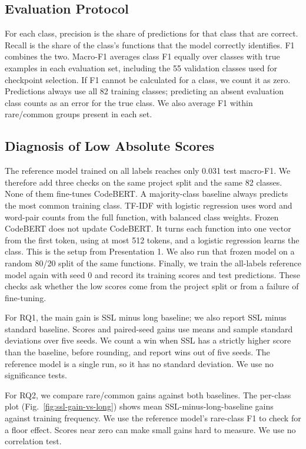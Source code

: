 \documentclass[conference]{IEEEtran}
\begin{document}
\subsection{Evaluation Protocol}\label{evaluation-protocol}

For each class, precision is the share of predictions for that class
that are correct. Recall is the share of the class's functions that the
model correctly identifies. F1 combines the two. Macro-F1 averages class
F1 equally over classes with true examples in each evaluation set,
including the 55 validation classes used for checkpoint selection. If F1
cannot be calculated for a class, we count it as zero. Predictions
always use all 82 training classes; predicting an absent evaluation
class counts as an error for the true class. We also average F1 within
rare/common groups present in each set.

\subsection{Diagnosis of Low Absolute
Scores}\label{diagnosis-of-low-absolute-scores}

The reference model trained on all labels reaches only 0.031 test macro-F1. We therefore add three checks on the same project split and the same 82 classes. None of them fine-tunes CodeBERT. A majority-class baseline always predicts the most common training class. TF-IDF with logistic regression uses word and word-pair counts from the full function, with balanced class weights. Frozen CodeBERT does not update CodeBERT. It turns each function into one vector from the first token, using at most 512 tokens, and a logistic regression learns the class. This is the setup from Presentation 1. We also run that frozen model on a random 80/20 split of the same functions. Finally, we train the all-labels reference model again with seed 0 and record its training scores and test predictions. These checks ask whether the low scores come from the project split or from a failure of fine-tuning.

For RQ1, the main gain is SSL minus long baseline; we also report SSL
minus standard baseline. Scores and paired-seed gains use means and
sample standard deviations over five seeds. We count a win when SSL has
a strictly higher score than the baseline, before rounding, and report
wins out of five seeds. The reference model is a single run, so it has
no standard deviation. We use no significance tests.

For RQ2, we compare rare/common gains against both baselines. The
per-class plot (Fig.~\ref{fig:ssl-gain-vs-long}) shows mean
SSL-minus-long-baseline gains against training frequency. We use the
reference model's rare-class F1 to check for a floor effect. Scores near
zero can make small gains hard to measure. We use no correlation test.
\end{document}
